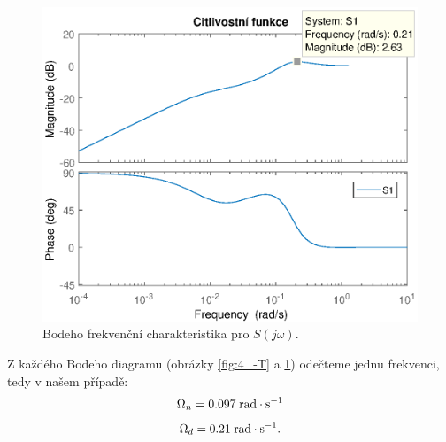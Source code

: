 \documentclass[a4paper,11pt]{article}
\begin{document}
\begin{figure}[htbp]
	\begin{center}
	\includegraphics[scale = 1.0]{obrazky/citlivostniFunkceCtyrka.eps}
	\caption{Bodeho frekvenční charakteristika pro $ S\left ( j\omega  \right ) $.}
	\label{fig:4_S}
	\end{center}
\end{figure}

Z každého Bodeho diagramu (obrázky \ref{fig:4_-T} a \ref{fig:4_S}) odečteme jednu frekvenci, tedy v našem případě:
\begin{equation} \label{eq:Omega_n}
\Omega _{n}= 0.097\; \textup{rad}\cdot\textup{s}^{-1}
\end{equation}
\begin{equation}\label{eq:Omega_d} 
\Omega _{d}= 0.21\; \textup{rad}\cdot\textup{s}^{-1}.
\end{equation}


\newpage 
\end{document}
